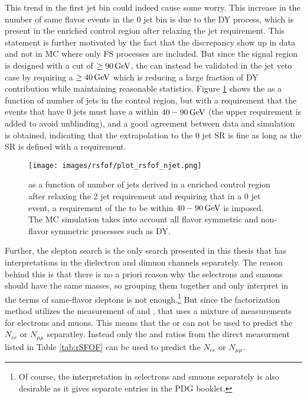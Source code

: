 This trend in the first jet bin could indeed cause some worry.
This increase in the number of same flavor events in the 0 jet bin is due to the DY process, which is present in the \ttbar enriched control region after relaxing the jet requirement.
This statement is further motivated by the fact that the discrepancy show up in data and not in MC where only FS processes are included.
But since the signal region is designed with a cut of \mttwo$\geq90\,\text{Ge\hspace{-.08em}V}$, the \Rsfof can instead be validated in the jet veto case by requiring a \mttwo$\geq40\,\text{Ge\hspace{-.08em}V}$ which is reducing a large fraction of DY contribution while maintaining reasonable statistics.
Figure \ref{fig:rsfofSleptonTwo} shows the \Rsfof as a function of number of jets in the \ttbar control region, but with a requirement that the events that have 0 jets must have a \mttwo within $40-90\,\text{Ge\hspace{-.08em}V}$ (the upper requirement is added to avoid unblinding), and a good agreement between data and simulation is obtained, indicating that the extrapolation to the 0 jet SR is fine as long as the SR is defined with a \mttwo requirement.
\begin{figure}[htbp!]
\begin{center}
    \texttt{[image: images/rsfof/plot\_rsfof\_njet.png]}
\caption{\Rsfof as a function of number of jets derived in a \ttbar enriched control region after relaxing the 2 jet requirement and requiring that in a 0 jet event, a requirement of the \mttwo to be     within $40-90\,\text{Ge\hspace{-.08em}V}$ is imposed. The MC simulation takes into account all flavor symmetric and non-flavor symmetric processes such as DY.}
\label{fig:rsfofSleptonTwo}
\end{center}
\end{figure}
\newpara
\noindent\justify
Further, the slepton search is the only search presented in this thesis that has interpretations in the dielectron and dimuon channels separately.
The reason behind this is that there is no a priori reason why the selectrons and smuons should have the same masses, so grouping them together and only interpret in the terms of same-flavor sleptons is not enough.\footnote{Of course, the interpretation in selectrons and smuons separately is also desirable as it gives separate entries in the PDG booklet. }
But since the factorization method utilizes the measurement of \rmue and \RT, that uses a mixture of measurements for electrons and muons.
This means that the \rmue or \RT can not be used to predict the $N_{ee}$ or $N_{\mu\mu}$ separatley.
Instead only the \Reeof and \Rmmof ratios from the direct measurment listed in Table \ref{tab:rSFOF} can be used to predict the $N_{ee}$ or $N_{\mu\mu}$.
